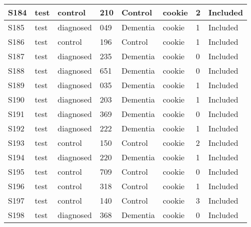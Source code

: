 \begin{center}
\begin{longtable}{|l|l|l|l|l|l|l|l|}
S184           & test                  & control           & 210     & Control        & cookie          & 2            & Included      \\ \hline
S185           & test                  & diagnosed         & 049     & Dementia       & cookie          & 1            & Included      \\ \hline
S186           & test                  & control           & 196     & Control        & cookie          & 1            & Included      \\ \hline
S187           & test                  & diagnosed         & 235     & Dementia       & cookie          & 0            & Included      \\ \hline
S188           & test                  & diagnosed         & 651     & Dementia       & cookie          & 0            & Included      \\ \hline
S189           & test                  & diagnosed         & 035     & Dementia       & cookie          & 1            & Included      \\ \hline
S190           & test                  & diagnosed         & 203     & Dementia       & cookie          & 1            & Included      \\ \hline
S191           & test                  & diagnosed         & 369     & Dementia       & cookie          & 0            & Included      \\ \hline
S192           & test                  & diagnosed         & 222     & Dementia       & cookie          & 1            & Included      \\ \hline
S193           & test                  & control           & 150     & Control        & cookie          & 2            & Included      \\ \hline
S194           & test                  & diagnosed         & 220     & Dementia       & cookie          & 1            & Included      \\ \hline
S195           & test                  & control           & 709     & Control        & cookie          & 0            & Included      \\ \hline
S196           & test                  & control           & 318     & Control        & cookie          & 1            & Included      \\ \hline
S197           & test                  & control           & 140     & Control        & cookie          & 3            & Included      \\ \hline
S198           & test                  & diagnosed         & 368     & Dementia       & cookie          & 0            & Included      \\ \hline

\end{longtable}
\end{center}

